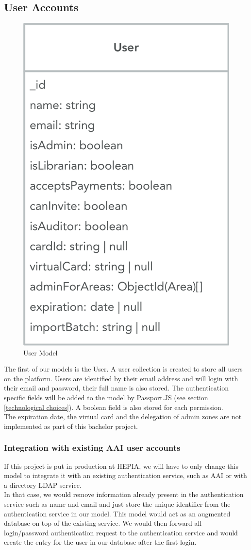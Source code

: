 \documentclass[11pt,a4paper]{report}
\begin{document}
\subsection{User Accounts}
\begin{figure}[H]
\begin{center}
	\includegraphics[width=.4\textwidth]{assets/user_model}
	\caption{User Model}
\end{center}
\end{figure}

The first of our models is the User. A user collection is created to store all users on the platform. Users are identified by their email address and will login with their email and password, their full name is also stored. The authentication specific fields will be added to the model by Passport.JS (see section \ref{technological choices}). A boolean field is also stored for each permission.\\

The expiration date, the virtual card and the delegation of admin zones are not implemented as part of this bachelor project.
\subsubsection{Integration with existing AAI user accounts}
If this project is put in production at HEPIA, we will have to only change this model to integrate it with an existing authentication service, such as AAI or with a directory LDAP service.\\

In that case, we would remove information already present in the authentication service such as name and email and just store the unique identifier from the authentication service in our model. This model would act as an augmented database on top of the existing service. We would then forward all login/password authentication request to the authentication service and would create the entry for the user in our database after the first login.\\
\end{document}
